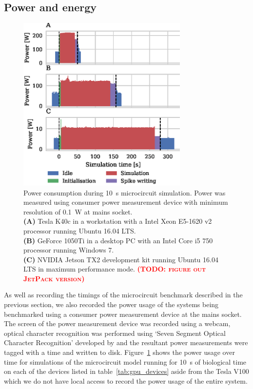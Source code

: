 \documentclass[utf8]{frontiersSCNS} %
\newcommand{\todo}[1]{\textbf{\textsc{\textcolor{red}{(TODO: #1)}}}}
\begin{document}
\subsection{Power and energy}
\begin{figure}
    \begin{center}
        \includegraphics[width=85mm]{figures/microcircuit_power}
    \end{center}
    \caption{Power consumption during \SI{10}{\second} microcircuit simulation.
    Power was measured using consumer power measurement device with minimum resolution of \SI{0.1}{\watt} at mains socket.\\
    \textbf{(A)} Tesla K40c in a workstation with a Intel Xeon E5-1620 v2 processor running Ubuntu 16.04 LTS.\\
    \textbf{(B)} GeForce 1050Ti in a desktop PC with an Intel Core i5 750 processor running Windows 7.\\
    \textbf{(C)} NVIDIA Jetson TX2 development kit running Ubuntu 16.04 LTS in maximum performance mode. \todo{figure out JetPack version}}
    \label{fig:microcircuit_power}
\end{figure}

As well as recording the timings of the microcircuit benchmark described in the previous section, we also recorded the power usage of the systems being benchmarked using a consumer power measurement device at the mains socket.
The screen of the power measurement device was recorded using a webcam, optical character recognition was performed using `Seven Segment Optical Character Recognition' developed by \citet{Auerswald2018} and the resultant power measurements were tagged with a time and written to disk.
Figure~\ref{fig:microcircuit_power} shows the power usage over time for simulations of the microcircuit model running for \SI{10}{\second} of biological time on each of the devices listed in table~\ref{tab:gpu_devices} aside from the Tesla V100 which we do not have local access to record the power usage of the entire system.
\end{document}
